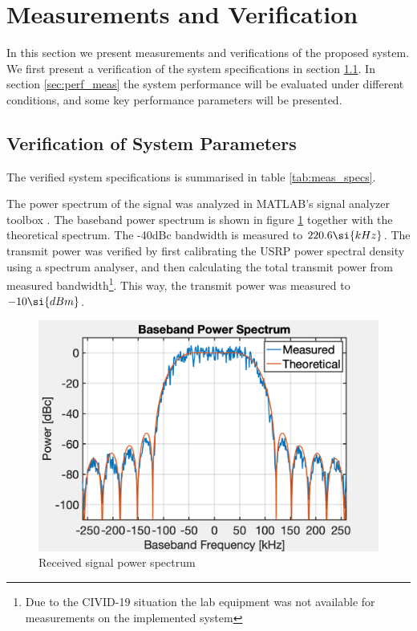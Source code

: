 \section{Measurements and Verification}
\label{sec:verification}
In this section we present measurements and verifications of the proposed system. We first present a verification of the system specifications in section \ref{sec:specs_verification}. In section \ref{sec:perf_meas} the system performance will be evaluated under different conditions, and some key performance parameters will be presented.

\subsection{Verification of System Parameters}
\label{sec:specs_verification}
The verified system specifications is summarised in table \ref{tab:meas_specs}.


The power spectrum of the signal was analyzed in MATLAB's signal analyzer toolbox \cite{signalAnalyzer}. The baseband power spectrum is shown in figure \ref{fig:pwr_spectrum} together with the theoretical spectrum. The -40dBc bandwidth is measured to $\measBW \si{kHz}$.
The transmit power was verified by first calibrating the USRP power spectral density using a spectrum analyser, and then calculating the total transmit power from measured bandwidth\footnote{Due to the CIVID-19 situation the lab equipment was not available for measurements on the implemented system}. This way, the transmit power was measured to $\measPWR \si{dBm}$.

\begin{figure}[htbp]
\begin{center}
\includegraphics[width=\figW\linewidth]{spectrum.png}
\caption{Received signal power spectrum}
\label{fig:pwr_spectrum}
\end{center}
\end{figure}

